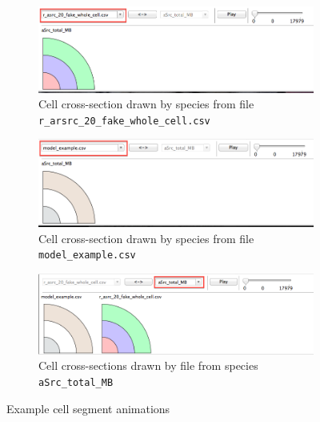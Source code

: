 \begin{figure}[h!]
    \centering
    \begin{subfigure}[b]{0.9\textwidth}
        \centering
        \includegraphics[width=\textwidth]{images/by_file_fake.png}
        \caption{Cell cross-section drawn by species from file \texttt{r\_arsrc\_20\_fake\_whole\_cell.csv}}
        \label{fig:cell_seg_file_fake}
    \end{subfigure}

    \begin{subfigure}[b]{0.9\textwidth}
        \centering
        \includegraphics[width=\textwidth]{images/by_file_model.png}
        \caption{Cell cross-section drawn by species from file \texttt{model\_example.csv}}
        \label{fig:cell_seg_file_model}
    \end{subfigure}

    \begin{subfigure}[b]{0.9\textwidth}
        \centering
        \includegraphics[width=\textwidth]{images/by_species_asrc.png}
        \caption{Cell cross-sections drawn by file from species \texttt{aSrc\_total\_MB}}
        \label{fig:cell_seg_species}
    \end{subfigure}
    \caption{Example cell segment animations}
    \label{fig:cell_segments}
\end{figure}

